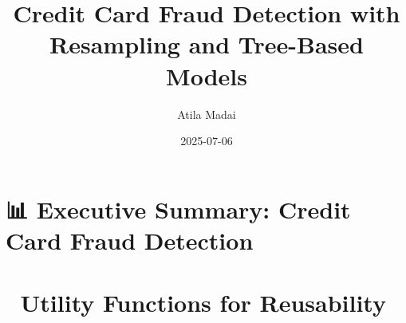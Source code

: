 \documentclass[
  letterpaper,
  DIV=11,
  numbers=noendperiod]{scrartcl}
\title{Credit Card Fraud Detection with Resampling and Tree-Based
Models}
\author{Atila Madai}
\date{2025-07-06}
\renewcommand*\contentsname{Table of contents}
\newcommand\contentsname{Table of contents}
\begin{document}
\maketitle

\renewcommand*\contentsname{Table of contents}
{
\hypersetup{linkcolor=}
\setcounter{tocdepth}{3}
\tableofcontents
}

\section{📊 Executive Summary: Credit Card Fraud
Detection}\label{executive-summary-credit-card-fraud-detection}

\section{🧱 Utility Functions for
Reusability}\label{utility-functions-for-reusability}
\end{document}
